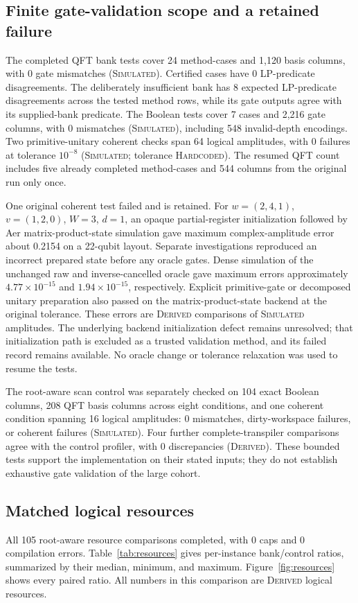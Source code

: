 \documentclass[referee,pdflatex,sn-mathphys-num]{sn-jnl}
\theoremstyle{thmstyleone}
\theoremstyle{thmstyletwo}
\begin{document}
\subsection{Finite gate-validation scope and a retained failure}
The completed QFT bank tests cover 24 method-cases and 1,120 basis columns, with 0 gate mismatches (\textsc{Simulated}). Certified cases have 0 LP-predicate disagreements. The deliberately insufficient bank has 8 expected LP-predicate disagreements across the tested method rows, while its gate outputs agree with its supplied-bank predicate. The Boolean tests cover 7 cases and 2,216 gate columns, with 0 mismatches (\textsc{Simulated}), including 548 invalid-depth encodings. Two primitive-unitary coherent checks span 64 logical amplitudes, with 0 failures at tolerance $10^{-8}$ (\textsc{Simulated}; tolerance \textsc{Hardcoded}). The resumed QFT count includes five already completed method-cases and 544 columns from the original run only once.

One original coherent test failed and is retained. For $w=(2,4,1)$, $v=(1,2,0)$, $W=3$, $d=1$, an opaque partial-register initialization followed by Aer matrix-product-state simulation gave maximum complex-amplitude error about 0.2154 on a 22-qubit layout. Separate investigations reproduced an incorrect prepared state before any oracle gates. Dense simulation of the unchanged raw and inverse-cancelled oracle gave maximum errors approximately $4.77\times10^{-15}$ and $1.94\times10^{-15}$, respectively. Explicit primitive-gate or decomposed unitary preparation also passed on the matrix-product-state backend at the original tolerance. These errors are \textsc{Derived} comparisons of \textsc{Simulated} amplitudes. The underlying backend initialization defect remains unresolved; that initialization path is excluded as a trusted validation method, and its failed record remains available. No oracle change or tolerance relaxation was used to resume the tests.

The root-aware scan control was separately checked on 104 exact Boolean columns, 208 QFT basis columns across eight conditions, and one coherent condition spanning 16 logical amplitudes: 0 mismatches, dirty-workspace failures, or coherent failures (\textsc{Simulated}). Four further complete-transpiler comparisons agree with the control profiler, with 0 discrepancies (\textsc{Derived}). These bounded tests support the implementation on their stated inputs; they do not establish exhaustive gate validation of the large cohort.

\subsection{Matched logical resources}
All 105 root-aware resource comparisons completed, with 0 caps and 0 compilation errors. Table~\ref{tab:resources} gives per-instance bank/control ratios, summarized by their median, minimum, and maximum. Figure~\ref{fig:resources} shows every paired ratio. All numbers in this comparison are \textsc{Derived} logical resources.
\end{document}
